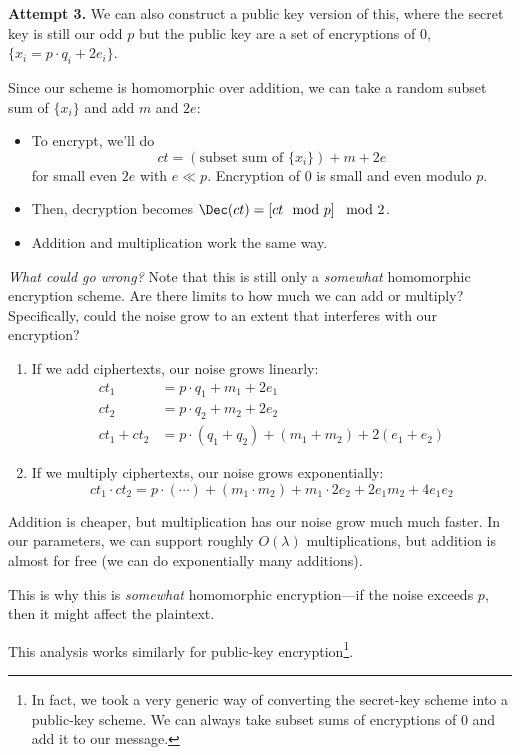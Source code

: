 \textbf{Attempt 3.} We can also construct a public key version of this, where the secret key is still our odd $p$ but the public key are a set of encryptions of $0$, $\{x_i = p\cdot q_i + 2e_i\}$.

Since our scheme is homomorphic over addition, we can take a random subset sum of $\{x_i\}$ and add $m$ and $2e$:
\begin{itemize}
    \item To encrypt, we'll do
          \[ct = (\text{subset sum of $\{x_i\}$}) + m + 2e\]
          for small even $2e$ with $e \ll p$. Encryption of $0$ is small and even modulo $p$.
    \item Then, decryption becomes $\Dec(ct) = \left[ ct\mod p \right]\mod 2$.
    \item Addition and multiplication work the same way.
\end{itemize}

\emph{What could go wrong?} Note that this is still only a \emph{somewhat} homomorphic encryption scheme. Are there limits to how much we can add or multiply? Specifically, could the noise grow to an extent that interferes with our encryption?
\begin{enumerate}
    \item If we add ciphertexts, our noise grows linearly:
          \begin{align*}
              ct_1        & = p\cdot q_1 + m_1 + 2e_1                         \\
              ct_2        & = p\cdot q_2 + m_2 + 2e_2                         \\
              ct_1 + ct_2 & = p\cdot (q_1 + q_2) + (m_1 + m_2) + 2(e_1 + e_2)
          \end{align*}
    \item If we multiply ciphertexts, our noise grows exponentially:
          \[ct_1 \cdot ct_2 = p\cdot (\cdots) + (m_1 \cdot m_2) + m_1\cdot 2e_2 + 2e_1m_2 + 4e_1e_2\]
\end{enumerate}
Addition is cheaper, but multiplication has our noise grow much much faster. In our parameters, we can support roughly $O(\lambda)$ multiplications, but addition is almost for free (we can do exponentially many additions).

This is why this is \emph{somewhat} homomorphic encryption---if the noise exceeds $p$, then it might affect the plaintext.

This analysis works similarly for public-key encryption\footnote{In fact, we took a very generic way of converting the secret-key scheme into a public-key scheme. We can always take subset sums of encryptions of $0$ and add it to our message.}.

